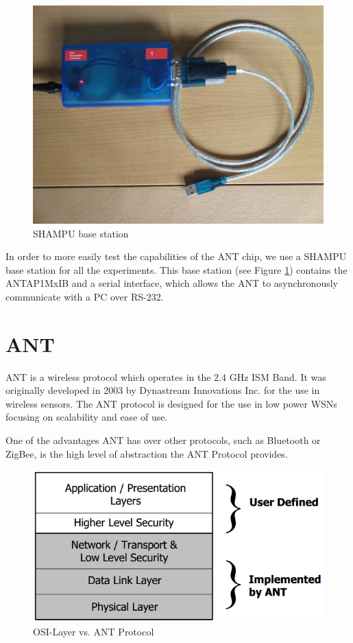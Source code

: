 \begin{figure}[H]
	\centering
	\includegraphics[scale=.5]{./pics/SHAMPUbase.JPG}
	\caption{SHAMPU base station}\label{fig:shampubase}
\end{figure}
In order to more easily test the capabilities of the ANT chip, we use a SHAMPU base station for all the experiments. This base station (see Figure \ref{fig:shampubase}) contains the ANTAP1MxIB and a serial interface, which allows the ANT to asynchronously communicate with a PC over RS-232. 

\section{ANT}
ANT \cite{DynastreamInnovationsInc.2013} is a wireless protocol which operates in the 2.4 GHz ISM Band. It was originally developed in 2003 by Dynastream Innovations Inc. for the use in wireless sensors. The ANT protocol is designed for the use in low power WSNs focusing on scalability and ease of use.

One of the advantages ANT has over other protocols, such as Bluetooth or ZigBee, is the high level of abstraction the ANT Protocol provides. 
\begin{figure}[H]
	\centering
	\includegraphics[scale=.5]{./pics/ANTstack.png}
	\caption{OSI-Layer vs. ANT Protocol\cite{Networks}}\label{fig:osilayer}
\end{figure}

